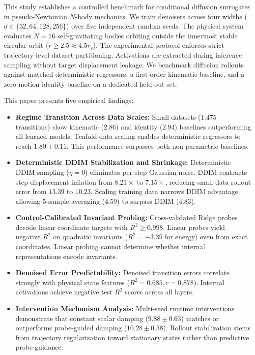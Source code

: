 \documentclass[11pt,a4paper]{article}
\begin{document}
This study establishes a controlled benchmark for conditional diffusion surrogates in pseudo-Newtonian $N$-body mechanics. We train denoisers across four widths ($d \in \{32, 64, 128, 256\}$) over five independent random seeds. The physical system evaluates $N=16$ self-gravitating bodies orbiting outside the innermost stable circular orbit ($r \ge 2.5 \approx 4.5 r_s$). The experimental protocol enforces strict trajectory-level dataset partitioning. Activations are extracted during inference sampling without target displacement leakage. We benchmark diffusion rollouts against matched deterministic regressors, a first-order kinematic baseline, and a zero-motion identity baseline on a dedicated held-out set.

This paper presents five empirical findings:
\begin{itemize}
    \item \textbf{Regime Transition Across Data Scales:} Small datasets (1,475 transitions) show kinematic ($2.86$) and identity ($2.94$) baselines outperforming all learned models. Tenfold data scaling enables deterministic regressors to reach $1.80 \pm 0.11$. This performance surpasses both non-parametric baselines.
    \item \textbf{Deterministic DDIM Stabilization and Shrinkage:} Deterministic DDIM sampling ($\eta = 0$) \cite{song2020denoising} eliminates per-step Gaussian noise. DDIM contracts step displacement inflation from $8.21\times$ to $7.15\times$, reducing small-data rollout error from $13.39$ to $10.23$. Scaling training data narrows DDIM advantage, allowing 5-sample averaging ($4.59$) to surpass DDIM ($4.83$).
    \item \textbf{Control-Calibrated Invariant Probing:} Cross-validated Ridge probes decode linear coordinate targets with $R^2 \ge 0.998$. Linear probes yield negative $R^2$ on quadratic invariants ($R^2 = -3.39$ for energy) even from exact coordinates. Linear probing cannot determine whether internal representations encode invariants.
    \item \textbf{Denoised Error Predictability:} Denoised transition errors correlate strongly with physical state features ($R^2 = 0.685, r = 0.878$). Internal activations achieve negative test $R^2$ scores across all layers.
    \item \textbf{Intervention Mechanism Analysis:} Multi-seed runtime interventions demonstrate that constant scalar damping ($9.88 \pm 0.63$) matches or outperforms probe-guided damping ($10.28 \pm 0.38$). Rollout stabilization stems from trajectory regularization toward stationary states rather than predictive probe guidance.
\end{itemize}
\end{document}

